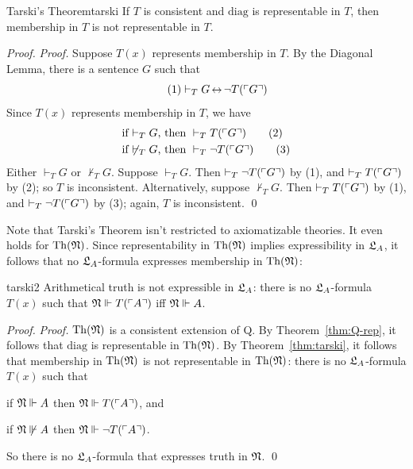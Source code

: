 \begin{theorem}{Tarski's Theorem}{tarski}
  If $T$ is consistent and $\mathrm{diag}$ is representable in $T$,
  then membership in $T$ is not representable in $T$.
\end{theorem}
\begin{proof}
  \setcounter{equation}{0}
  \emph{Proof.}
  Suppose $T(x)$ represents membership in $T$.
  By the Diagonal Lemma, there is a sentence $G$ such that
  \begin{equation}\tag{1}
    \vdash_{T} G \leftrightarrow \neg T(\gn{G})
  \end{equation}
  Since $T(x)$ represents membership in $T$,
  we have
  \begin{align}
    \text{if $\vdash_{T} G$,} &\text{ then } \vdash_{T} T(\ulcorner G \urcorner) \tag{2}\\
    \text{if $\not\vdash_{T} G$,} &\text{ then } \vdash_{T} \neg T(\ulcorner G \urcorner)\tag{3}
  \end{align}
  Either $\vdash_T G$ or $\not\vdash_T G$.
  Suppose $\vdash_T G$.
  Then $\vdash_{T} \neg T(\ulcorner G \urcorner)$ by (1),
  and $\vdash_{T} T(\ulcorner G \urcorner)$ by (2);
  so $T$ is inconsistent.
  Alternatively, suppose $\not\vdash_{T} G$.
  Then $\vdash_{T} T(\ulcorner G \urcorner)$ by (1),
  and $\vdash_{T} \neg T(\ulcorner G \urcorner)$ by (3);
  again, $T$ is inconsistent.
  \qed
\end{proof}

Note that Tarski's Theorem isn't restricted to axiomatizable theories.
It even holds for $\mathrm{Th}(\mathfrak{N})$.
Since representability in $\mathrm{Th}(\mathfrak{N})$ implies expressibility in $\mathfrak{L}_A$,
it follows that no $\mathfrak{L}_A$-formula expresses membership in $\mathrm{Th}(\mathfrak{N})$:

\begin{theorem}{}{tarski2}
  Arithmetical truth is not expressible in $\mathfrak{L}_A$:
  there is no $\mathfrak{L}_A$-formula $T(x)$ such that
  $\mathfrak{N} \Vdash T(\ulcorner A \urcorner)$ iff $\mathfrak{N} \Vdash A$.
\end{theorem}
\begin{proof}
  \emph{Proof.}
  $\mathrm{Th}(\mathfrak{N})$ is a consistent extension of Q.
  By Theorem~\ref{thm:Q-rep}, it follows that 
  $\mathrm{diag}$ is representable in $\mathrm{Th}(\mathfrak{N})$.
  By Theorem~\ref{thm:tarski}, it follows that
  membership in $\mathrm{Th}(\mathfrak{N})$ is not representable in $\mathrm{Th}(\mathfrak{N})$:
  there is no $\mathfrak{L}_A$-formula $T(x)$ such that
  \begin{cenumerate}
    \item[(i)] if $\mathfrak{N} \Vdash A$ then $\mathfrak{N} \Vdash T(\ulcorner A \urcorner)$, and
    \item[(ii)] if $\mathfrak{N} \not\Vdash A$ then $\mathfrak{N} \Vdash \neg T(\ulcorner A \urcorner)$.
  \end{cenumerate}
  So there is no $\mathfrak{L}_A$-formula that expresses truth in $\mathfrak{N}$. 
  \qed
\end{proof}

